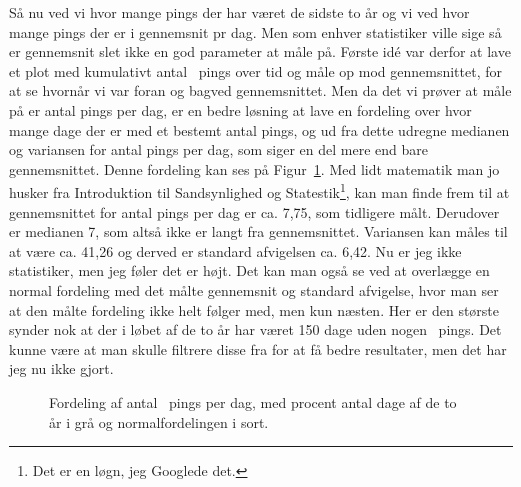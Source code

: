 \begin{article}
Så nu ved vi hvor mange pings der har været de sidste to år og vi ved hvor mange pings der er i gennemsnit pr dag. Men som enhver statistiker ville sige så er gennemsnit slet ikke en god parameter at måle på.
Første idé var derfor at lave et plot med kumulativt antal \coffee\ pings over tid og måle op mod gennemsnittet, for at se hvornår vi var foran og bagved gennemsnittet.
Men da det vi prøver at måle på er antal pings per dag, er en bedre løsning at lave en fordeling over hvor mange dage der er med et bestemt antal pings, og ud fra dette udregne medianen og variansen for antal pings per dag, som siger en del mere end bare gennemsnittet. Denne fordeling kan ses på Figur~\ref{fig:days_count_distribution}.
Med lidt matematik man jo husker fra Introduktion til Sandsynlighed og Statestik\footnote{Det er en løgn, jeg Googlede det.}, kan man finde frem til at gennemsnittet for antal pings per dag er ca. 7,75, som tidligere målt. Derudover er medianen 7, som altså ikke er langt fra gennemsnittet. Variansen kan måles til at være ca. 41,26 og derved er standard afvigelsen ca. 6,42. Nu er jeg ikke statistiker, men jeg føler det er højt.
Det kan man også se ved at overlægge en normal fordeling med det målte gennemsnit og standard afvigelse, hvor man ser at den målte fordeling ikke helt følger med, men kun næsten.
Her er den største synder nok at der i løbet af de to år har været 150 dage uden nogen \coffee\ pings. Det kunne være at man skulle filtrere disse fra for at få bedre resultater, men det har jeg nu ikke gjort.

\begin{figure}[H]
	\centering
	\resizebox{\linewidth}{!}{}
	\vspace{-15pt}
	\caption{Fordeling af antal \protect\coffee\ pings per dag, med procent antal dage af de to år i grå og normalfordelingen i sort.}
	\label{fig:days_count_distribution}
\end{figure}


\end{article}
